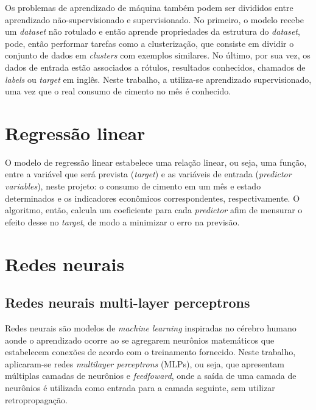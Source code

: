 Os problemas de aprendizado de máquina também podem ser divididos entre
 aprendizado não-supervisionado e supervisionado. No primeiro, o modelo recebe
um \textit{dataset} não rotulado e então aprende propriedades da estrutura do \textit{dataset}, pode, então
performar tarefas como a clusterização, que consiste em dividir o conjunto de dados
em \textit{clusters} com exemplos similares. No último, por sua vez, os dados de 
entrada estão associados a rótulos, resultados conhecidos, chamados de \textit{labels} ou
\textit{target} em inglês. Neste trabalho, a utiliza-se aprendizado supervisionado, uma vez 
que o real consumo de cimento no mês é conhecido.\cite{Goodfellow-et-al-2016}

  
\section{Regressão linear}
O modelo de regressão linear estabelece uma relação linear, ou seja, uma 
função, entre a variável que será prevista (\textit{target}) e as variáveis 
de entrada (\textit{predictor variables}), neste projeto: o consumo de 
cimento em um mês e estado determinados e os indicadores econômicos
 correspondentes, respectivamente. O algoritmo, então, calcula um 
 coeficiente para cada \textit{predictor} afim de mensurar o efeito
  desse no \textit{target}, de modo a minimizar o erro na previsão.
     
\section{Redes neurais}

\subsection{Redes neurais multi-layer perceptrons}
Redes neurais são modelos de \textit{machine learning} inspiradas no cérebro humano aonde o aprendizado ocorre ao se agregarem neurônios matemáticos que estabelecem conexões de acordo com o treinamento fornecido. Neste trabalho, aplicaram-se redes \textit{multilayer perceptrons} (MLPs), ou seja, que apresentam múltiplas camadas de neurônios e \textit{feedfoward}, onde a saída de uma camada de neurônios é utilizada como entrada para a camada seguinte, sem utilizar retropropagação.
          
